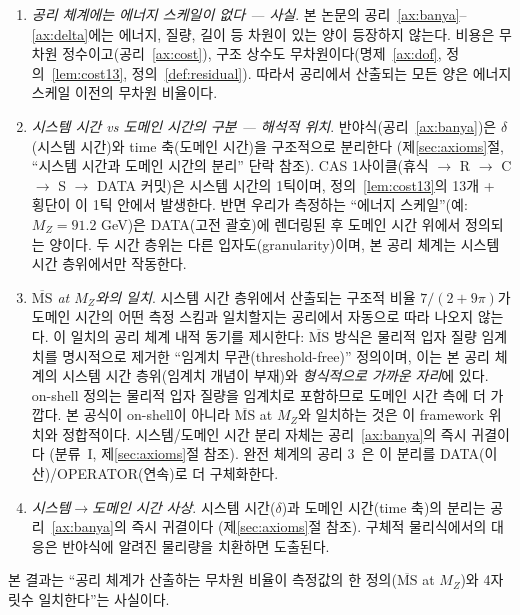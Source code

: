 \documentclass[entropy,article,submit,pdftex,oneauthor]{Definitions/mdpi}
\begin{document}
\begin{enumerate}
\item \emph{공리 체계에는 에너지 스케일이 없다 — 사실}. 본 논문의 공리~\ref{ax:banya}--\ref{ax:delta}에는 에너지, 질량, 길이 등 차원이 있는 양이 등장하지 않는다. 비용은 무차원 정수이고(공리~\ref{ax:cost}), 구조 상수도 무차원이다(명제~\ref{ax:dof}, 정의~\ref{lem:cost13}, 정의~\ref{def:residual}). 따라서 공리에서 산출되는 모든 양은 에너지 스케일 이전의 무차원 비율이다.

\item \emph{시스템 시간 vs 도메인 시간의 구분 — 해석적 위치}. 반야식(공리~\ref{ax:banya})은 $\delta$(시스템 시간)와 time 축(도메인 시간)을 구조적으로 분리한다 (제\ref{sec:axioms}절, ``시스템 시간과 도메인 시간의 분리'' 단락 참조). CAS 1사이클(휴식 $\to$ R $\to$ C $\to$ S $\to$ DATA 커밋)은 시스템 시간의 1틱이며, 정의~\ref{lem:cost13}의 13개 + 횡단이 이 1틱 안에서 발생한다. 반면 우리가 측정하는 ``에너지 스케일''(예: $M_Z = 91.2$ GeV)은 DATA(고전 괄호)에 렌더링된 후 도메인 시간 위에서 정의되는 양이다. 두 시간 층위는 다른 입자도(granularity)이며, 본 공리 체계는 시스템 시간 층위에서만 작동한다.

\item \emph{$\overline{\mathrm{MS}}$ at $M_Z$와의 일치}. 시스템 시간 층위에서 산출되는 구조적 비율 $7/(2+9\pi)$가 도메인 시간의 어떤 측정 스킴과 일치할지는 공리에서 자동으로 따라 나오지 않는다. 이 일치의 공리 체계 내적 동기를 제시한다: $\overline{\mathrm{MS}}$ 방식은 물리적 입자 질량 임계치를 명시적으로 제거한 ``임계치 무관(threshold-free)'' 정의이며, 이는 본 공리 체계의 시스템 시간 층위(임계치 개념이 부재)와 \emph{형식적으로 가까운 자리}에 있다. on-shell 정의는 물리적 입자 질량을 임계치로 포함하므로 도메인 시간 측에 더 가깝다. 본 공식이 on-shell이 아니라 $\overline{\mathrm{MS}}$ at $M_Z$와 일치하는 것은 이 framework 위치와 정합적이다. 시스템/도메인 시간 분리 자체는 공리~\ref{ax:banya}의 즉시 귀결이다 (분류~I, 제\ref{sec:axioms}절 참조). 완전 체계의 공리 3~\cite{han2026}은 이 분리를 DATA(이산)/OPERATOR(연속)로 더 구체화한다.

\item \emph{시스템$\to$도메인 시간 사상}. 시스템 시간($\delta$)과 도메인 시간(time 축)의 분리는 공리~\ref{ax:banya}의 즉시 귀결이다 (제\ref{sec:axioms}절 참조). 구체적 물리식에서의 대응은 반야식에 알려진 물리량을 치환하면 도출된다.
\end{enumerate}

본 결과는 ``공리 체계가 산출하는 무차원 비율이 측정값의 한 정의($\overline{\mathrm{MS}}$ at $M_Z$)와 4자릿수 일치한다''는 사실이다.
\end{document}
